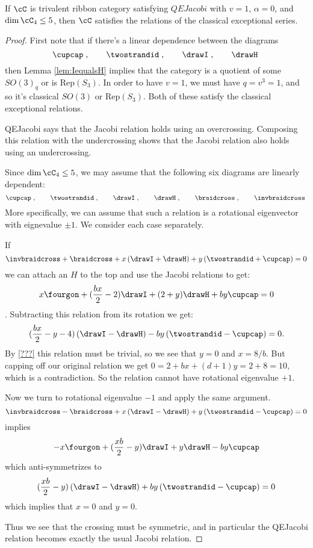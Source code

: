\documentclass[12pt]{amsart}
\begin{document}
\begin{theorem}
If $\cC$ is trivalent ribbon category satisfying $QEJacobi$ with $v=1$, $\alpha =0$, and $\dim \cC_4 \leq 5$, then $\cC$ satisfies the relations of the classical exceptional series.
\end{theorem}
\begin{proof}
First note that if there's a linear dependence between the diagrams
 \[
  \cupcap\;,\qquad\twostrandid\;,
    \qquad\drawI\;,\qquad\drawH\; \]
then Lemma \ref{lem:IequalsH} implies that the category is a quotient of some $SO(3)_q$ or is $\mathrm{Rep}(S_3)$.  In order to have $v=1$, we must have $q = v^3 = 1$, and so it's classical $SO(3)$ or $\mathrm{Rep}(S_3)$.  Both of these satisfy the classical exceptional relations.

QEJacobi says that the Jacobi relation holds using an overcrossing.  Composing this relation with the undercrossing shows that the Jacobi relation also holds using an undercrossing.

Since $\dim \cC_4 \leq 5$, we may assume that the following six diagrams are linearly dependent:
 \[
  \cupcap\;,\qquad\twostrandid\;,
    \qquad\drawI\;,\qquad\drawH\;,\qquad\braidcross\;,\qquad \invbraidcross\;
   \]
More specifically, we can assume that such a relation is a rotational eigenvector with eignevalue $\pm 1$.  We consider each case separately.

If
\[\invbraidcross + \braidcross + x\left(\drawI + \drawH\right) + y \left(\twostrandid+\cupcap\right)=0\]
we can attach an $H$ to the top and use the Jacobi relations to get:
\[ x \fourgon +(\frac{bx}{2} -2) \drawI + (2+y)\drawH + b y \cupcap = 0\].
Subtracting this relation from its rotation we get:
\[(\frac{bx}{2} -y -4) \left(\drawI-\drawH\right) -b y \left(\twostrandid - \cupcap\right) = 0.\]
By \ref{???} this relation must be trivial, so we see that $y=0$ and $x = 8/b$.  But capping off our original relation we get $0 = 2+bx+(d+1)y = 2+8 = 10$, which is a contradiction.  So the relation cannot have rotational eigenvalue $+1$.

Now we turn to rotational eigenvalue $-1$ and apply the same argument.
\[\invbraidcross - \braidcross + x\left(\drawI - \drawH\right) + y \left(\twostrandid-\cupcap\right)=0\] implies
\[-x \fourgon + (\frac{xb}{2} -y) \drawI + y \drawH - b y \cupcap\] which anti-symmetrizes to
\[(\frac{xb}{2}-y) \left(\drawI - \drawH\right) + b y \left(\twostrandid - \cupcap\right) = 0\]
which implies that $x = 0$ and $y=0$.

Thus we see that the crossing must be symmetric, and in particular the QEJacobi relation becomes exactly the usual Jacobi relation.


\end{proof}
\end{document}
